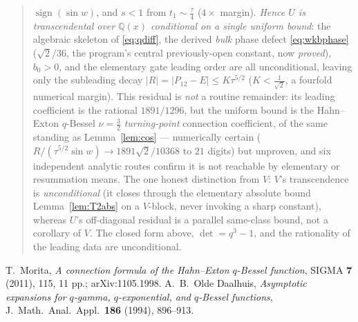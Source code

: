 \documentclass[11pt]{article}
\begin{document}
\begin{abstract}
\begin{enumerate}[leftmargin=1.6em,itemsep=0.15em]
$\operatorname{sign}(\sin w)$, and $s<1$ from $t_1\sim\tfrac\tau4$ ($4\times$ margin). \emph{Hence $U$ is transcendental over $\mathbb Q(x)$ conditional on a single uniform bound}: the algebraic
skeleton of \eqref{eq:qdiff}, the derived \emph{bulk} phase defect \eqref{eq:wkbphase} ($\sqrt2/36$, the
program's central previously-open constant, now \emph{proved}), $b_0>0$, and the elementary gate leading order
are all unconditional, leaving only the subleading decay $|R|=|P_{12}-E|\le K\tau^{5/2}$ ($K<\tfrac1{\sqrt2}$, a
fourfold numerical margin). This residual is \emph{not} a routine remainder: its leading coefficient is the
rational $1891/1296$, but the uniform bound is the Hahn--Exton $q$-Bessel $\nu=\tfrac32$ \emph{turning-point}
connection coefficient, of the same standing as Lemma~\ref{lem:cos} --- numerically certain
($R/(\tau^{5/2}\sin w)\to1891\sqrt2/10368$ to $21$ digits) but unproven, and six independent analytic routes
confirm it is not reachable by elementary or resummation means. The one honest distinction from $V$: $V$'s
transcendence is \emph{unconditional} (it closes through the elementary absolute bound Lemma~\ref{lem:T2abs} on a
$V$-block, never invoking a sharp constant), whereas $U$'s off-diagonal residual is a parallel same-class bound,
not a corollary of $V$. The closed form above, $\det=q^3-1$, and the rationality of the leading data are
unconditional.
\end{enumerate}
\end{abstract}

\tableofcontents
\bigskip


\clearpage

\clearpage

\clearpage

\clearpage


\begin{thebibliography}{9}
 T.~Morita, \emph{A connection formula of the Hahn--Exton
  $q$-Bessel function}, SIGMA \textbf{7} (2011), 115, 11 pp.; arXiv:1105.1998.
 A.~B.~Olde Daalhuis, \emph{Asymptotic expansions for
  $q$-gamma, $q$-exponential, and $q$-Bessel functions}, J.~Math.\ Anal.\ Appl.\
  \textbf{186} (1994), 896--913.
\end{thebibliography}
\end{document}
